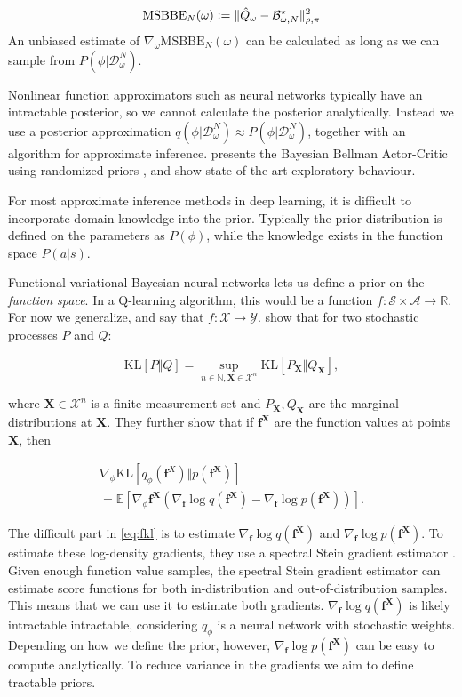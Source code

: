 \documentclass[]{uai2021} %
\newcommand{\defeq}{\vcentcolon=}
\newcommand{\R}{\mathbb{R}}
\newcommand{\E}{\mathbb{E}}
\newcommand{\N}{\mathbb{N}}
\newcommand{\D}{\mathcal{D}}
\newcommand{\B}{\mathcal{B}}
\newcommand{\X}{\mathbf{X}}
\newcommand{\f}{\mathbf{f}}
\newcommand{\state}{\mathcal{S}}
\newcommand{\action}{\mathcal{A}}
\newcommand{\KL}{\mathrm{KL}}
\begin{document}
\begin{equation}
    \mathrm{MSBBE}_N(\omega) \defeq \lVert \hat{Q}_{\omega} - \B^\star_{\omega, N} \lVert^2_{\rho, \pi}
\end{equation}
An unbiased estimate of \(\nabla_\omega \mathrm{MSBBE}_N(\omega)\) can be calculated as
long as we can sample from \(P(\phi \vert \D_\omega^N)\). 

Nonlinear function approximators such as neural networks typically have an intractable
posterior, so we cannot calculate the posterior analytically. Instead we use a posterior approximation
\(q(\phi \vert \D_\omega^N) \approx P(\phi \vert \D_\omega^N)\), together with an algorithm
for approximate inference. \citet{fellows_bayesian_2021} presents the Bayesian Bellman Actor-Critic
using randomized priors \citep{osband_randomized_2018}, and show state of the art exploratory
behaviour.

For most approximate inference methods in deep learning, it is difficult to incorporate domain
knowledge into the prior. Typically the prior distribution is defined on the parameters as \(P(\phi)\),
while the knowledge exists in the function space \(P(a \vert s)\).

Functional variational Bayesian neural networks \citep{sun_functional_2019} lets us define a prior on the
\emph{function space}. In a Q-learning algorithm, this would be a function
\(f : \state \times \action \rightarrow \R\). For now we generalize, and say that
\(f : \mathcal{X} \rightarrow \mathcal{Y}\).
\citet{sun_functional_2019} show that for two stochastic processes \(P\) and \(Q\):

\begin{equation}
    \KL[P \Vert Q] = \sup_{n \in \N, \X \in \mathcal{X}^n} \KL \left[ P_\X \Vert Q_\X \right],
\end{equation}

where \(\X \in \mathcal{X}^n\) is a finite measurement set and \(P_\X, Q_\X\) are the marginal distributions
at \(\X\). They further show that if \(\f^\X\) are the function values at points \(\X\), then

\begin{multline}\label{eq:fkl}
    \nabla_\phi \KL[q_\phi(\f^X) \Vert p(\f^\X)] \\
    = \E \left[ \nabla_\phi \f^\X( \nabla_\f \log q(\f^\X) - \nabla_\f \log p(\f^\X)) \right].
\end{multline}

The difficult part in \eqref{eq:fkl} is to estimate \(\nabla_\f \log q(\f^\X)\) and \(\nabla_\f \log p(\f^\X)\).
To estimate these log-density gradients, they use a spectral Stein gradient estimator \citep{shi_spectral_2018}.
Given enough function value samples, the spectral Stein gradient estimator can estimate score functions
for both in-distribution and out-of-distribution samples. This means that we can use it to estimate
both gradients. \(\nabla_\f \log q(\f^\X)\) is likely intractable intractable, considering \(q_\phi\) is
a neural network with stochastic weights. Depending on how we define the prior, however, \(\nabla_\f \log p(\f^\X)\)
can be easy to compute analytically. To reduce variance in the gradients we aim to define tractable priors.
\end{document}
